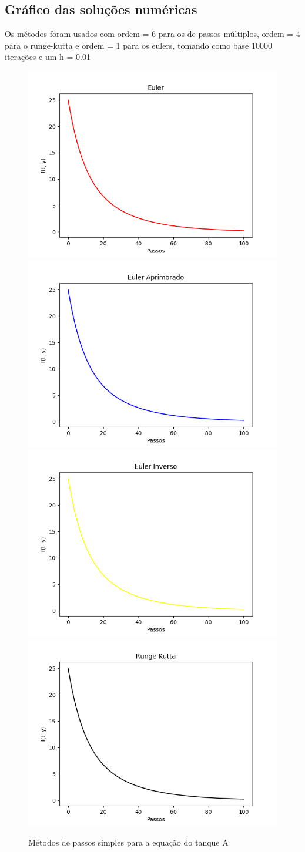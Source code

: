 \documentclass[12pt]{article}%
\begin{document}
    \newpage
    \subsection{Gráfico das soluções numéricas}
    Os métodos foram usados com ordem = 6 para os de passos múltiplos, ordem = 4 para o runge-kutta e ordem = 1 para os eulers, tomando como base 10000 iterações e um h = 0.01
    \begin{figure}[H]
        \begin{center}
            \includegraphics[width=.4\textwidth]{problemas/metodos_q1/tanque_a_euler.png}
            \includegraphics[width=.4\textwidth]{problemas/metodos_q1/tanque_a_euler_aprimorado.png}
            \includegraphics[width=.4\textwidth]{problemas/metodos_q1/tanque_a_euler_inverso.png}
            \includegraphics[width=.4\textwidth]{problemas/metodos_q1/tanque_a_runge_kutta.png}
        \end{center}
        \caption{Métodos de passos simples para a equação do tanque A}
    \end{figure}
\end{document}
